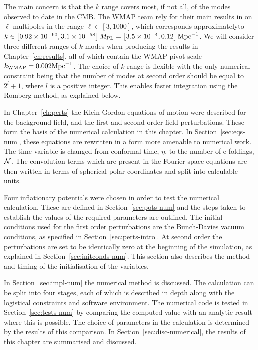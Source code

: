 The main concern is that the $k$ range covers most, if not all, of the modes observed
to date in the CMB. The WMAP team rely for their main results in 
 on $\ell$ multipoles in the range $\ell \in [3, 1000]$,
which corresponds approximately\footnotemark  to $k\in \left[0.92 \times 10^{-60}, 3.1 \times
10^{-58}\right]M_{\mathrm{PL}} = \left[3.5\times 10^{-4}, 0.12\right] \mathrm{Mpc}^{-1}$.
We will consider three different ranges of $k$ modes when producing the results in
Chapter~\ref{ch:results}, all of which contain the WMAP pivot scale
$k_\mathrm{WMAP}=0.002\mathrm{Mpc}^{-1}$. The
choice of $k$ range is flexible with the only numerical constraint being that the
number of modes at second order should be equal to $2^l +1$, where $l$ is a positive
integer. This enables
faster integration using the Romberg method, as explained below. 


In Chapter~\ref{ch:perts} the Klein-Gordon equations of motion were described for the
background field, and the first and second order field perturbations. These form the
basis of the numerical calculation in this chapter. In Section~\ref{sec:eqs-num},
these equations are rewritten in a form more amenable to numerical work. The time
variable is changed from conformal time, $\eta$, to the number of e-foldings, $\mathcal{N}$.
The convolution terms which are present in the Fourier space equations are then
written in terms of spherical polar coordinates and split into calculable units. 


Four inflationary potentials were chosen in order to test the numerical calculation.
These are defined in
Section~\ref{sec:pots-num} and the steps taken to establish the values of the
required parameters are outlined. The initial conditions used for the first order
perturbations are the Bunch-Davies vacuum conditions, as specified in
Section~\ref{sec:perts-intro}. At second order the perturbations are set to be
identically zero at the beginning of the simulation, as explained in
Section~\ref{sec:initconds-num}. This section also describes the method and timing of
the initialisation of the variables.


In Section~\ref{sec:impl-num} the numerical method is discussed. The calculation can
be split into four stages, each of which is described in depth along with the
logistical constraints and software environment. The numerical code is tested in
Section~\ref{sec:tests-num} by comparing the computed value with an analytic result
where this is possible. The choice of parameters in the calculation is determined by
the results of this comparison. In Section~\ref{sec:disc-numerical}, the results of
this chapter are summarised and discussed.


